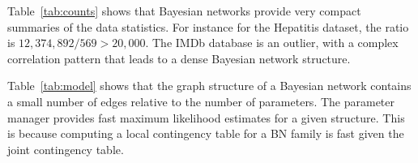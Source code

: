 \documentclass{sfuthesis}
\begin{document}
 
Table~\ref{tab:counts} shows that Bayesian networks provide very compact summaries of the data statistics. For instance for the Hepatitis dataset, the ratio is  $12,374,892/569 > 20,000$. The IMDb database is an outlier, with a complex correlation pattern that leads to a dense Bayesian network structure.

Table~\ref{tab:model} shows that the graph structure of a Bayesian network contains a small number of edges relative to the number of parameters. 
The parameter manager provides fast maximum likelihood estimates for a given structure. 
This is because computing a local contingency table for a BN family is fast given the joint contingency table.
%

\begin{table}[!h]
\caption{Model Manager Evaluation}
  \centering
  \label{tab:model}%
\end{table}%
\end{document}
